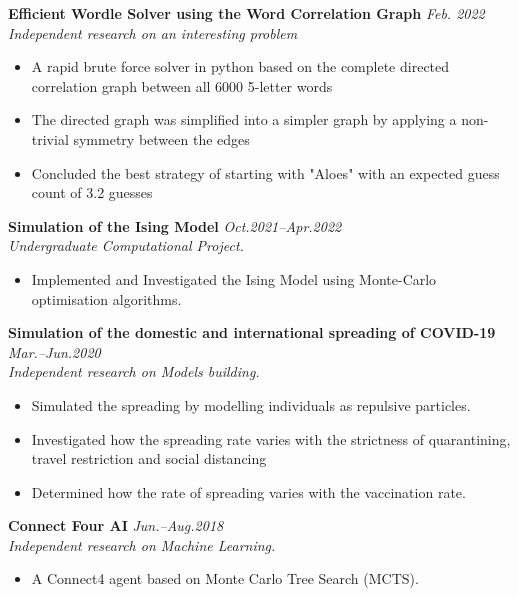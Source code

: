 \documentclass[11pt,a4paper,roman]{moderncv}        %
\begin{document}
\textbf{Efficient Wordle Solver using the Word Correlation Graph} \hfill \textit{Feb. 2022}\\
\textit{Independent research on an interesting problem}
\begin{itemize}
	\item A rapid brute force solver in python based on the complete directed correlation graph between all 6000 5-letter words
	\item The directed graph was simplified into a simpler graph by applying a non-trivial symmetry between the edges
	\item Concluded the best strategy of starting with "Aloes" with an expected guess count of 3.2 guesses
\end{itemize}
\vspace*{1mm}

\textbf{Simulation of the Ising Model} \hfill \textit{Oct.2021--Apr.2022}\\
\textit{Undergraduate Computational Project.}
\begin{itemize}
	\item Implemented and Investigated the Ising Model using Monte-Carlo optimisation algorithms.
\end{itemize}
\vspace*{1mm}

\textbf{Simulation of the domestic and international spreading of COVID-19} \hfill \textit{Mar.--Jun.2020}\\
\textit{Independent research on Models building.}
\begin{itemize}
	\item Simulated the spreading by modelling individuals as repulsive particles.
	\item Investigated how the spreading rate varies with the strictness of quarantining, travel restriction and  social distancing
	\item Determined how the rate of spreading varies with the vaccination rate.
\end{itemize}
\vspace*{1mm}

\textbf{Connect Four AI} \hfill \textit{Jun.--Aug.2018}\\
\textit{Independent research on Machine Learning.}
\vspace*{1mm}
\begin{itemize}
	\item A Connect4 agent based on Monte Carlo Tree Search (MCTS).
\end{itemize}
\vspace*{1mm}
\end{document}
